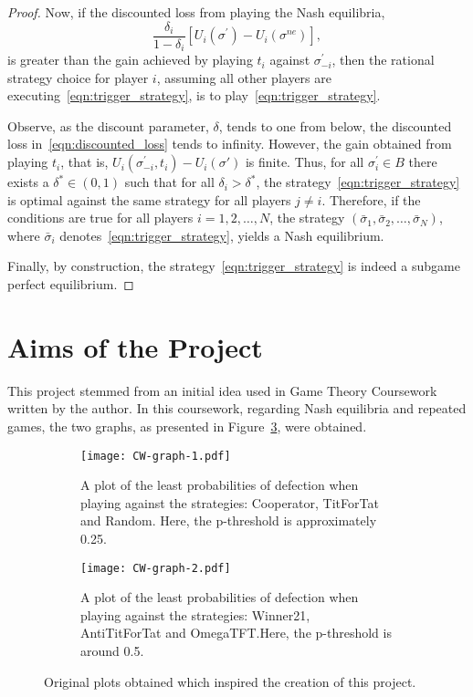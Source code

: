 \begin{proof}
    Now, if the discounted loss from playing the Nash equilibria,
    \begin{equation}
        \frac{\delta_{i}}{1-\delta_{i}}[U_{i}(\sigma^{\prime}) -
        U_{i}(\sigma^{ne})],
    \end{equation}\label{eqn:discounted_loss}
    is greater than the gain achieved by playing
    \(t_{i}\) against \(\sigma_{-i}^{\prime}\), then the rational
    strategy choice for player \(i\), assuming all other players are
    executing~\ref{eqn:trigger_strategy}, is to play~\ref{eqn:trigger_strategy}.
    
    Observe, as the discount parameter, \(\delta \), tends to one from
    below, the discounted loss in~\ref{eqn:discounted_loss} tends to infinity.
    However, the gain obtained from playing \(t_{i}\), that is,
    \(U_{i}(\sigma_{-i}^{\prime}, t_{i}) - U_{i}(\sigma{\prime})\) is finite.
    Thus, for all \(\sigma_{i}^{\prime} \in B\) there exists a \(\delta^{*} \in
    (0, 1)\) such that for all \(\delta_{i} > \delta^{*}\), the
    strategy~\ref{eqn:trigger_strategy} is optimal against the same strategy for
    all players \(j \ne i\). Therefore, if the conditions are true for all
    players \(i = 1,2,\ldots,N\), the strategy \((\bar{\sigma}_{1},
    \bar{\sigma}_{2}, \ldots, \bar{\sigma}_{N})\), where  \(\bar{\sigma}_{i}\)
    denotes~\ref{eqn:trigger_strategy}, yields a Nash equilibrium.

    Finally, by construction, the strategy~\ref{eqn:trigger_strategy} is indeed
    a subgame perfect equilibrium. 
\end{proof}

\section{Aims of the Project}\label{sec:Aims_of_the_Project}
This project stemmed from an initial idea used in Game Theory Coursework
written by the author. In this coursework, regarding Nash equilibria and
repeated games, the two graphs, as presented in Figure~\ref{fig:CW_plots}, were
obtained.

\begin{figure}[h]
    \centering
        \begin{subfigure}[t]{0.45\textwidth}
        \centering
        \texttt{[image: CW-graph-1.pdf]}
        \caption{A plot of the least probabilities of defection when playing against the strategies: Cooperator, TitForTat and Random. Here, the p-threshold is approximately 0.25.}\label{fig:CW_graph_1}
        \end{subfigure}
    \hfill
        \begin{subfigure}[t]{0.45\textwidth}
        \centering
        \texttt{[image: CW-graph-2.pdf]}
        \caption{A plot of the least probabilities of defection when playing against the strategies: Winner21, AntiTitForTat and OmegaTFT.\@ Here, the p-threshold is around 0.5.}\label{fig:CW_graph_2}
        \end{subfigure}
        \caption{Original plots obtained which inspired the creation of this project.}\label{fig:CW_plots}
\end{figure}

